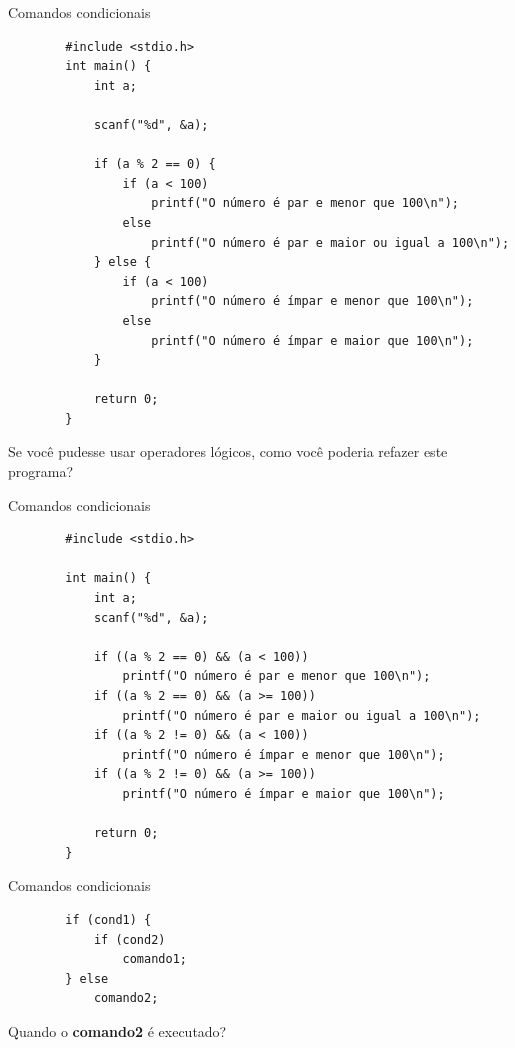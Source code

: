 \documentclass[handout]{beamer}
\begin{document}
\begin{frame}[fragile]{Comandos condicionais}

    \begin{verbatim}
        #include <stdio.h>
        int main() {
            int a;

            scanf("%d", &a);

            if (a % 2 == 0) {
                if (a < 100)
                    printf("O número é par e menor que 100\n");
                else
                    printf("O número é par e maior ou igual a 100\n");
            } else {
                if (a < 100)
                    printf("O número é ímpar e menor que 100\n");
                else
                    printf("O número é ímpar e maior que 100\n");
            }

            return 0;
        }
    \end{verbatim}

    Se você pudesse usar operadores lógicos, como você poderia refazer este programa?
\end{frame}

\begin{frame}[fragile]{Comandos condicionais}

    \begin{verbatim}
        #include <stdio.h>

        int main() {
            int a;
            scanf("%d", &a);

            if ((a % 2 == 0) && (a < 100))
                printf("O número é par e menor que 100\n");
            if ((a % 2 == 0) && (a >= 100))
                printf("O número é par e maior ou igual a 100\n");
            if ((a % 2 != 0) && (a < 100))
                printf("O número é ímpar e menor que 100\n");
            if ((a % 2 != 0) && (a >= 100))
                printf("O número é ímpar e maior que 100\n");

            return 0;
        }
    \end{verbatim}
\end{frame}

\begin{frame}[fragile]{Comandos condicionais}

    \begin{verbatim}
        if (cond1) {
            if (cond2)
                comando1;
        } else
            comando2;
    \end{verbatim}

    Quando o {\bf comando2} é executado?
\end{frame}
\end{document}
